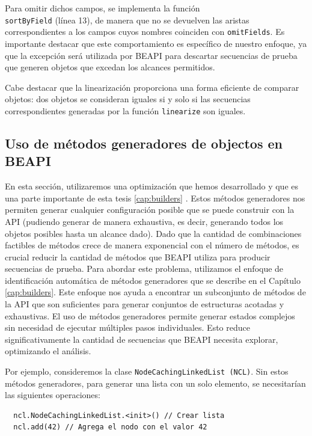 Para omitir dichos campos, se implementa la función \\
\texttt{sortByField} (línea 13), de manera que no se devuelven las aristas correspondientes a los campos cuyos nombres coinciden con \texttt{omitFields}. 
Es importante destacar que este comportamiento es específico de nuestro enfoque, ya que la excepción será utilizada por \textsf{BEAPI} para descartar secuencias de prueba que generen objetos que excedan los alcances permitidos.

Cabe destacar que la linearización proporciona una forma eficiente de comparar objetos: dos objetos se consideran iguales si y solo si las secuencias correspondientes generadas por la función \texttt{linearize} son iguales.


\subsection{Uso de m\'etodos generadores de objectos en BEAPI}
\label{sec:buildersOptimization}
En esta sección, utilizaremos una optimización que hemos desarrollado y que es
una parte importante de esta tesis \ref{cap:builders} . 
Estos métodos generadores nos permiten generar cualquier configuración posible que se puede construir con la API (pudiendo generar de manera exhaustiva, es decir, generando todos los objetos posibles hasta un alcance dado).
Dado que la cantidad de combinaciones factibles de métodos crece de manera exponencial con el número de métodos,
es crucial reducir la cantidad de métodos que \textsf{BEAPI} utiliza para producir secuencias de prueba. Para abordar este problema, 
utilizamos el enfoque de identificación automática de métodos generadores que se describe en el Capítulo \ref{cap:builders}.
Este enfoque nos ayuda a encontrar un subconjunto de métodos de la API que son suficientes para generar conjuntos de estructuras acotadas y exhaustivas. 
El uso de métodos generadores permite generar estados complejos sin necesidad de ejecutar múltiples pasos individuales. Esto reduce significativamente la cantidad de secuencias que BEAPI necesita explorar, optimizando el análisis. 

Por ejemplo, consideremos la clase \texttt{NodeCachingLinkedList (NCL)}. 
Sin estos m\'etodos generadores, para generar una lista con un solo elemento, se necesitarían las siguientes operaciones:
\vspace{1em}
\begin{lstlisting}
  ncl.NodeCachingLinkedList.<init>() // Crear lista
  ncl.add(42) // Agrega el nodo con el valor 42
\end{lstlisting}


